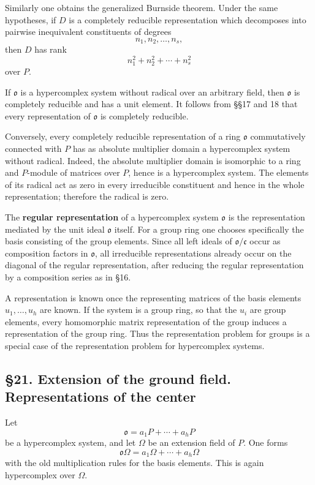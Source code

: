 \documentclass[11pt]{article}
\begin{document}
Similarly one obtains the generalized Burnside theorem. Under the same
hypotheses, if \(D\) is a completely reducible representation which
decomposes into pairwise inequivalent constituents of degrees \[
  n_1,n_2,\ldots,n_s,
\] then \(D\) has rank \[
  n_1^2+n_2^2+\cdots+n_s^2
\] over \(P\).

If \(\mathfrak{o}\) is a hypercomplex system without radical over an
arbitrary field, then \(\mathfrak{o}\) is completely reducible and has a
unit element. It follows from §§17 and 18 that every representation of
\(\mathfrak{o}\) is completely reducible.

Conversely, every completely reducible representation of a ring
\(\mathfrak{o}\) commutatively connected with \(P\) has as absolute
multiplier domain a hypercomplex system without radical. Indeed, the
absolute multiplier domain is isomorphic to a ring and \(P\)-module of
matrices over \(P\), hence is a hypercomplex system. The elements of its
radical act as zero in every irreducible constituent and hence in the
whole representation; therefore the radical is zero.

The \textbf{regular representation} of a hypercomplex system
\(\mathfrak{o}\) is the representation mediated by the unit ideal
\(\mathfrak{o}\) itself. For a group ring one chooses specifically the
basis consisting of the group elements. Since all left ideals of
\(\mathfrak{o}/\mathfrak c\) occur as composition factors in
\(\mathfrak{o}\), all irreducible representations already occur on the
diagonal of the regular representation, after reducing the regular
representation by a composition series as in §16.

A representation is known once the representing matrices of the basis
elements \(u_1,\ldots,u_h\) are known. If the system is a group ring, so
that the \(u_i\) are group elements, every homomorphic matrix
representation of the group induces a representation of the group ring.
Thus the representation problem for groups is a special case of the
representation problem for hypercomplex systems.

\subsection{§21. Extension of the ground field. Representations of the
center}\label{extension-of-the-ground-field.-representations-of-the-center}

Let \[
  \mathfrak{o}=a_1P+\cdots+a_hP
\] be a hypercomplex system, and let \(\Omega\) be an extension field of
\(P\). One forms \[
  \mathfrak{o}\Omega=a_1\Omega+\cdots+a_h\Omega
\] with the old multiplication rules for the basis elements. This is
again hypercomplex over \(\Omega\).
\end{document}
